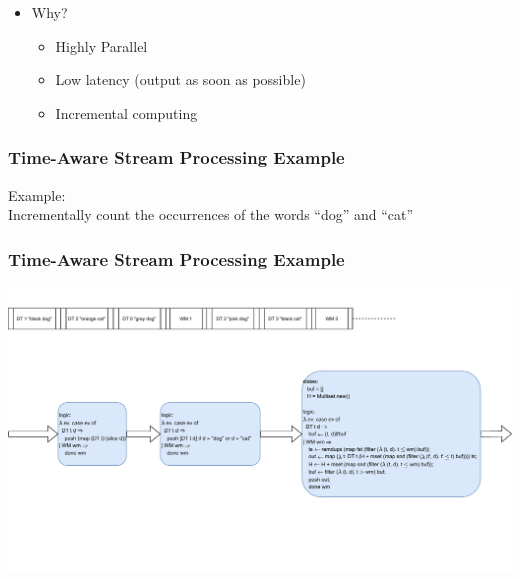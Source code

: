 \documentclass[aspectratio=169,10pt]{beamer}
\begin{document}
\begin{frame}[fragile]
\begin{itemize}
\begin{overlayarea}{\textwidth}{.1\textheight}
\begin{figure}
              \centering
            \end{figure}
          \end{overlayarea}
          \vspace*{-1ex}
          \pause
    \item Why?
          \begin{itemize}
            \item Highly Parallel
            \item Low latency (output as soon as possible)
            \item Incremental computing
          \end{itemize}
  \end{itemize}
\end{frame}

\begin{frame}[fragile]
  \frametitle{Time-Aware Stream Processing Example}
  Example:\\
  Incrementally count the occurrences of the words ``dog'' and ``cat''
\end{frame}

\begin{frame}[fragile]
  \frametitle{Time-Aware Stream Processing Example}
    \includegraphics[page=1,width=.95\textwidth]{dataflow_ex1.pdf}
\end{frame}
\end{document}
